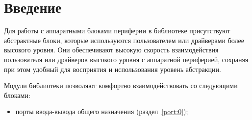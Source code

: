 \section{Введение}
Для работы с аппаратными блоками периферии в библиотеке присутствуют абстрактные блоки, которые используются пользователем или драйверами более высокого уровня. Они обеспечивают высокую скорость взаимодействия пользователя или драйверов высокого уровня с аппаратной периферией, сохраняя при этом удобный для восприятия и использования уровень абстракции.

Модули библиотеки позволяют комфортно взаимодействовать со следующими блоками:
\begin{itemize}
	\item порты ввода-вывода общего назначения (раздел~\ref{port:0});
\end{itemize}

